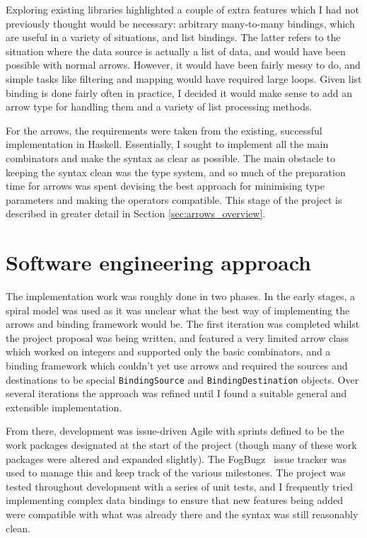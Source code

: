 \documentclass[12pt,twoside,notitlepage]{report}
\begin{document}
Exploring existing libraries highlighted a couple of extra features which I had not previously thought would be necessary: arbitrary many-to-many bindings, which are useful in a variety of situations, and list bindings. The latter refers to the situation where the data source is actually a list of data, and would have been possible with normal arrows. However, it would have been fairly messy to do, and simple tasks like filtering and mapping would have required large loops. Given list binding is done fairly often in practice, I decided it would make sense to add an arrow type for handling them and a variety of list processing methods.

For the arrows, the requirements were taken from the existing, successful implementation in Haskell. Essentially, I sought to implement all the main combinators and make the syntax as clear as possible. The main obstacle to keeping the syntax clean was the type system, and so much of the preparation time for arrows was spent devising the best approach for minimising type parameters and making the operators compatible. This stage of the project is described in greater detail in Section \ref{sec:arrows_overview}.

\section{Software engineering approach}

The implementation work was roughly done in two phases. In the early stages, a spiral model was used as it was unclear what the best way of implementing the arrows and binding framework would be. The first iteration was completed whilst the project proposal was being written, and featured a very limited arrow class which worked on integers and supported only the basic combinators, and a binding framework which couldn't yet use arrows and required the sources and destinations to be special \texttt{BindingSource} and \texttt{BindingDestination} objects. Over several iterations the approach was refined until I found a suitable general and extensible implementation.

From there, development was issue-driven Agile with sprints defined to be the work packages designated at the start of the project (though many of these work packages were altered and expanded slightly). The FogBugz~\cite{fogbugz} issue tracker was used to manage this and keep track of the various milestones. The project was tested throughout development with a series of unit tests, and I frequently tried implementing complex data bindings to ensure that new features being added were compatible with what was already there and the syntax was still reasonably clean.
\end{document}
